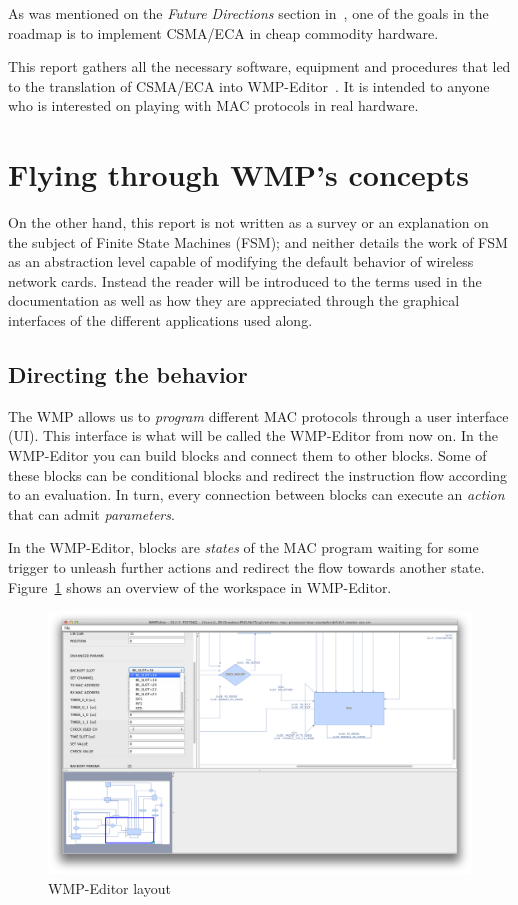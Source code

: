 As was mentioned on the \emph{Future Directions} section in~\cite{fairness-ECA}, one of the goals in the roadmap is to implement CSMA/ECA in cheap commodity hardware.

This report gathers all the necessary software, equipment and procedures that led to the translation of CSMA/ECA into WMP-Editor~\cite{FLAVIA}\cite{WMP-code}. It is intended to anyone who is interested on playing with MAC protocols in real hardware.

\section{Flying through WMP's concepts} 

On the other hand, this report is not written as a survey or an explanation on the subject of Finite State Machines (FSM); and neither details the work of FSM as an abstraction level capable of modifying the default behavior of wireless network cards. Instead the reader will be introduced to the terms used in the documentation as well as how they are appreciated through the graphical interfaces of the different applications used along.

\subsection{Directing the behavior}

The WMP allows us to \emph{program} different MAC protocols through a user interface (UI). This interface is what will be called the WMP-Editor from now on. In the WMP-Editor you can build blocks and connect them to other blocks. Some of these blocks can be conditional blocks and redirect the instruction flow according to an evaluation. In turn, every connection between blocks can execute an \emph{action} that can admit \emph{parameters}.

In the WMP-Editor, blocks are \emph{states} of the MAC program waiting for some trigger to unleash further actions and redirect the flow towards another state. Figure~\ref{fig:WMP-EditorLayout} shows an overview of the workspace in WMP-Editor.

\begin{figure}[htbp]
  \centering
  \includegraphics[width=0.95\linewidth]{figures/WMP-EditorLayout.eps}
  \caption{WMP-Editor layout
  \label{fig:WMP-EditorLayout}}
\end{figure}

